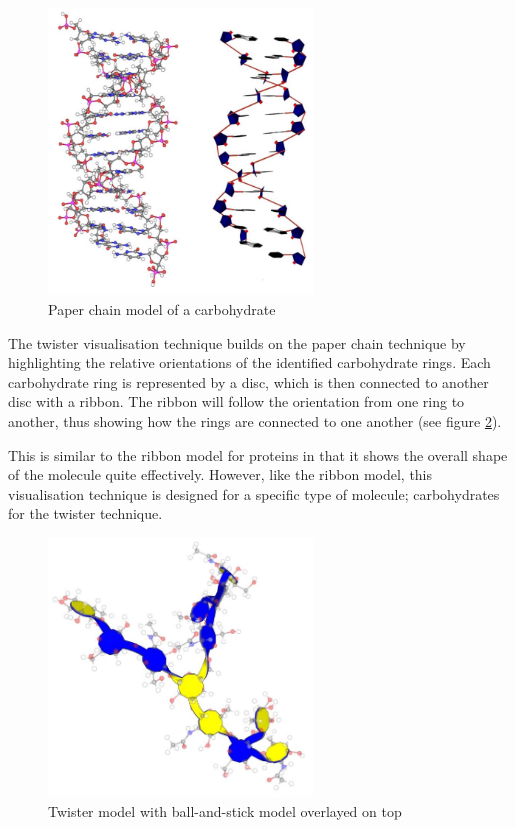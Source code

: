 \begin{figure}[h!]
  \begin{center}
    \includegraphics[width=70mm]{paper_chain}
  \end{center}
  \caption{Paper chain model of a carbohydrate}
  \label{fig:background_paperchain}
\end{figure}

The twister visualisation technique \citep{kuttel06} builds on the paper chain
technique by highlighting the relative orientations of the identified
carbohydrate rings. Each carbohydrate ring is represented by a disc, which is
then connected to another disc with a ribbon. The ribbon will follow the
orientation from one ring to another, thus showing how the rings are connected
to one another (see figure \ref{fig:background_twister}).

This is similar to the ribbon model for proteins in that it shows the overall
shape of the molecule quite effectively. However, like the ribbon model, this
visualisation technique is designed for a specific type of molecule;
carbohydrates for the twister technique.

\begin{figure}[h!]
  \begin{center}
    \includegraphics[width=70mm]{twister}
  \end{center}
  \caption{Twister model with ball-and-stick model overlayed on top}
  \label{fig:background_twister}
\end{figure}

